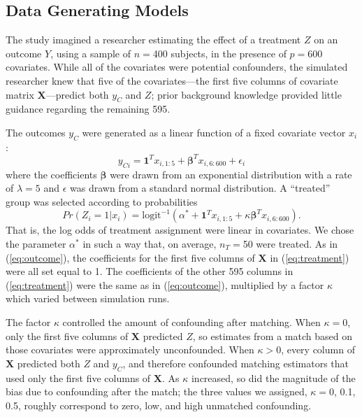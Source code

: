 \documentclass[12pt]{article}\usepackage[]{graphicx}\usepackage[]{color}
\newcommand{\covMat}{\bm{X}}
\newcommand{\covVec}{x}
\begin{document}
\subsection{Data Generating Models}\label{sec:sim-data-generating}
The study imagined a researcher estimating the effect of a treatment
$Z$ on an outcome $Y$, using a sample of $n=$400 subjects, in
the presence of $p=$600 covariates.
While all of the covariates were potential confounders, the simulated researcher knew that five of the covariates---the first
five columns of covariate matrix $\covMat$---predict both $y_C$ and
$Z$; prior background knowledge provided little guidance regarding the
remaining 595.

The outcomes $y_C$ were generated as a linear function of a
fixed covariate vector $\covVec_i$:
\begin{equation}\label{eq:outcome}
y_{Ci}=\bm{1 }^T x_{i, 1:5}+\bm{\beta }^T x_{i,6:600}+\epsilon_i
\end{equation}
where the coefficients $\bm{\beta}$ were drawn from an exponential
distribution with a rate of $\lambda=5$ and $\epsilon$ was drawn from a standard normal distribution.
 A ``treated'' group was selected
 according to probabilities
\begin{equation}\label{eq:treatment}
Pr(Z_i=1|\covVec_i)=\mathrm{logit}^{-1}(\alpha^*+\bm{1 }^Tx_{i,
  1:5}+\kappa\bm{\beta }^Tx_{i,6:600}).
\end{equation}
That is, the log odds of treatment assignment were linear in covariates.
We chose the parameter $\alpha^*$ in such a way that, on average,
$n_T=$50 were treated.
As in (\ref{eq:outcome}), the coefficients for the first five columns of $\covMat$ in (\ref{eq:treatment}) were all set equal to 1.
The coefficients of the other 595 columns in  (\ref{eq:treatment}) were the same as in (\ref{eq:outcome}), multiplied by a factor $\kappa$ which varied between simulation runs.

The factor $\kappa$ controlled the amount of confounding after matching.
When $\kappa=0$, only the first five columns of $\covMat$ predicted $Z$,
so estimates from a match based on those covariates were approximately unconfounded.
When $\kappa>0$, every column of $\covMat$ predicted both $Z$ and $y_C$, and therefore confounded matching estimators that used only the first five columns of $\covMat$.
As $\kappa$ increased, so did the magnitude of the bias due to
confounding after the match; the three values we assigned,
$\kappa=$0, 0.1, 0.5, roughly correspond
to zero, low, and high unmatched confounding.
\end{document}
